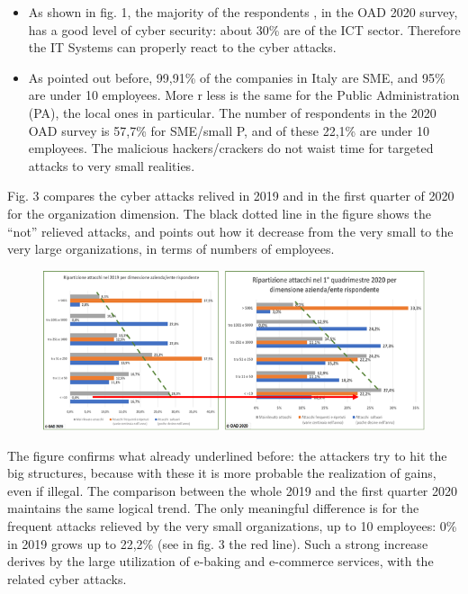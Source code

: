 \documentclass{easychair}
\begin{document}
\begin{itemize}
\item As shown in fig. 1, the majority of the respondents , in the OAD 2020 survey, has a good level of cyber security: about 30\% are of the ICT sector. 
Therefore the IT Systems can properly react to the cyber attacks. 

\item As pointed out before, 99,91\% of the companies in Italy are SME, and 95\% are under 10 employees. More r less is the same for the Public Administration (PA), 
the local ones in particular. The number of respondents in the 2020 OAD survey is 57,7\% for SME/small P, and of these 22,1\% are under 10 employees. 
The malicious hackers/crackers do not waist time for targeted attacks to very small realities.
\end{itemize}

Fig. 3 compares the cyber attacks relived in 2019 and in the first quarter of 2020 for the organization dimension. The black dotted line in the figure shows 
the “not” relieved attacks, and points out how it decrease from the very small to the very large organizations, in terms of numbers of employees. 


\begin{figure}
	\centering
		\includegraphics[width=1\textwidth]{pictures/fig3.png}
		\caption{}
		\label{fig:3}
\end{figure}


The figure confirms what already underlined before: the attackers try to hit the big structures, because with these it is more probable the realization of gains, even if illegal.
The comparison between the whole 2019 and the first quarter 2020 maintains the same logical trend. The only meaningful difference is for the frequent attacks relieved by the very
small organizations, up to 10 employees: 0\% in 2019 grows up to 22,2\% (see in fig. 3 the red line). Such a strong increase derives by the large utilization of e-baking and 
e-commerce services, with the related cyber attacks.
\end{document}
